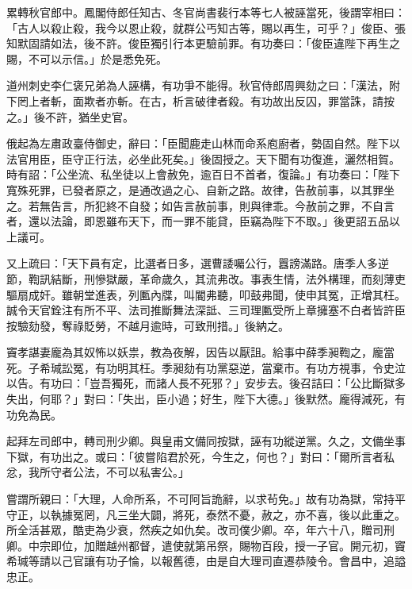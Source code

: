 \begin{pinyinscope}
 累轉秋官郎中。鳳閣侍郎任知古、冬官尚書裴行本等七人被誣當死，後謂宰相曰：「古人以殺止殺，我今以恩止殺，就群公丐知古等，賜以再生，可乎？」俊臣、張知默固請如法，後不許。俊臣獨引行本更驗前罪。有功奏曰：「俊臣違陛下再生之賜，不可以示信。」於是悉免死。



 道州刺史李仁褒兄弟為人誣構，有功爭不能得。秋官侍郎周興劾之曰：「漢法，附下罔上者斬，面欺者亦斬。在古，析言破律者殺。有功故出反囚，罪當誅，請按之。」後不許，猶坐史官。



 俄起為左肅政臺侍御史，辭曰：「臣聞鹿走山林而命系庖廚者，勢固自然。陛下以法官用臣，臣守正行法，必坐此死矣。」後固授之。天下聞有功復進，灑然相賀。時有詔：「公坐流、私坐徒以上會赦免，逾百日不首者，復論。」有功奏曰：「陛下寬殊死罪，已發者原之，是通改過之心、自新之路。故律，告赦前事，以其罪坐之。若無告言，所犯終不自發；如告言赦前事，則與律乖。今赦前之罪，不自言者，還以法論，即恩雖布天下，而一罪不能貸，臣竊為陛下不取。」後更詔五品以上議可。



 又上疏曰：「天下員有定，比選者日多，選曹諉囑公行，囂謗滿路。唐季人多逆節，鞫訊結斷，刑慘獄嚴，革命歲久，其流弗改。事表生情，法外構理，而刻薄吏驅扇成奸。雖朝堂進表，列匭內牒，叫閽弗聽，叩鼓弗聞，使申其冤，正增其枉。誠令天官銓注有所不平、法司推斷舞法深詆、三司理匭受所上章擁塞不白者皆許臣按驗劾發，奪祿貶勞，不越月逾時，可致刑措。」後納之。



 竇孝諶妻龐為其奴怖以妖祟，教為夜解，因告以厭詛。給事中薛季昶鞫之，龐當死。子希瑊訟冤，有功明其枉。季昶劾有功黨惡逆，當棄市。有功方視事，令史泣以告。有功曰：「豈吾獨死，而諸人長不死邪？」安步去。後召詰曰：「公比斷獄多失出，何耶？」對曰：「失出，臣小過；好生，陛下大德。」後默然。龐得減死，有功免為民。



 起拜左司郎中，轉司刑少卿。與皇甫文備同按獄，誣有功縱逆黨。久之，文備坐事下獄，有功出之。或曰：「彼嘗陷君於死，今生之，何也？」對曰：「爾所言者私忿，我所守者公法，不可以私害公。」



 嘗謂所親曰：「大理，人命所系，不可阿旨詭辭，以求茍免。」故有功為獄，常持平守正，以執據冤罔，凡三坐大闢，將死，泰然不憂，赦之，亦不喜，後以此重之。所全活甚眾，酷吏為少衰，然疾之如仇矣。改司僕少卿。卒，年六十八，贈司刑卿。中宗即位，加贈越州都督，遣使就第吊祭，賜物百段，授一子官。開元初，竇希瑊等請以己官讓有功子惀，以報舊德，由是自大理司直遷恭陵令。會昌中，追謚忠正。




\end{pinyinscope}
